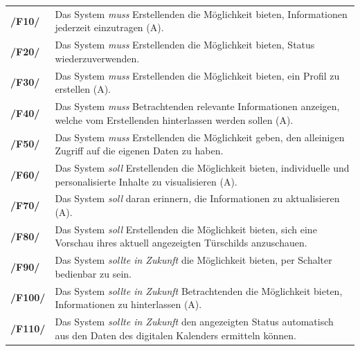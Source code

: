 \begin{center}
        \renewcommand{\arraystretch}{1.5}
        \begin{tabular}{p{}p{}}
                \hline
                \textbf{/F10/}  & Das System \textit{muss} Erstellenden die Möglichkeit bieten, Informationen jederzeit einzutragen (A).                             \\
                \textbf{/F20/}  & Das System \textit{muss} Erstellenden die Möglichkeit bieten, Status wiederzuverwenden.                                            \\
                \textbf{/F30/}  & Das System \textit{muss} Erstellenden die Möglichkeit bieten, ein Profil zu erstellen (A).                                         \\
                \textbf{/F40/}  & Das System \textit{muss} Betrachtenden relevante Informationen anzeigen, welche vom Erstellenden hinterlassen werden sollen (A).   \\
                \textbf{/F50/}  & Das System \textit{muss} Erstellenden die Möglichkeit geben, den alleinigen Zugriff auf die eigenen Daten zu haben.                \\
                \textbf{/F60/}  & Das System \textit{soll} Erstellenden die Möglichkeit bieten, individuelle und personalisierte Inhalte zu visualisieren (A).       \\
                \textbf{/F70/}  & Das System \textit{soll} daran erinnern, die Informationen zu aktualisieren (A).                                                   \\
                \textbf{/F80/}  & Das System \textit{soll} Erstellenden die Möglichkeit bieten, sich eine Vorschau ihres aktuell angezeigten Türschilds anzuschauen. \\
                \textbf{/F90/}  & Das System \textit{sollte in Zukunft} die Möglichkeit bieten, per Schalter bedienbar zu sein.                                      \\
                \textbf{/F100/} & Das System \textit{sollte in Zukunft} Betrachtenden die Möglichkeit bieten, Informationen zu hinterlassen (A).                     \\
                \textbf{/F110/} & Das System \textit{sollte in Zukunft} den angezeigten Status automatisch aus den Daten des digitalen Kalenders ermitteln können.   \\
                \hline
        \end{tabular}
\end{center}


